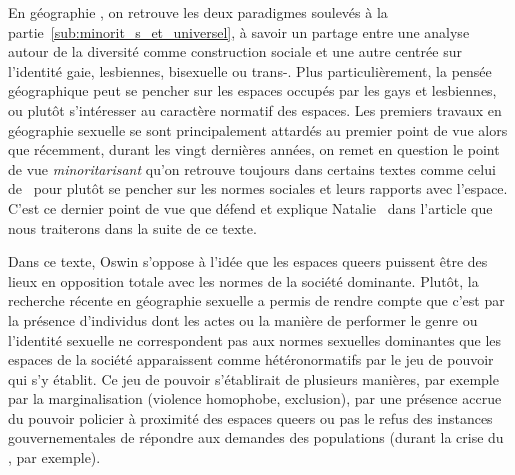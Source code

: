 
En géographie \qu{}, on retrouve les deux paradigmes soulevés à la partie~\ref{sub:minorit_s_et_universel}, à savoir un partage entre une analyse autour de la diversité comme construction sociale et une autre centrée sur l'identité gaie, lesbiennes, bisexuelle ou trans-. 
Plus particulièrement, la pensée géographique peut se pencher sur les espaces occupés par les gays et lesbiennes, ou plutôt s'intéresser au caractère normatif des espaces. 
Les premiers travaux en géographie sexuelle se sont principalement attardés au premier point de vue alors que récemment, durant les vingt dernières années, on remet en question le point de vue \emph{minoritarisant} qu'on retrouve toujours dans certains textes comme celui de~\citet{Sinfield1996} pour plutôt se pencher sur les normes sociales et leurs rapports avec l'espace. 
C'est ce dernier point de vue que défend et explique Natalie~\citet{Oswin2008} dans l'article  que nous traiterons dans la suite de ce texte.

Dans ce texte, Oswin s'oppose à l'idée que les espaces queers puissent être des lieux en opposition totale avec les normes de la société dominante. 
Plutôt, la recherche récente en géographie sexuelle a permis de rendre compte que c'est par la présence d'individus dont les actes ou la manière de performer le genre ou l'identité sexuelle ne correspondent pas aux normes sexuelles dominantes que les espaces de la société apparaissent comme hétéronormatifs par le jeu de pouvoir qui s'y établit. 
Ce jeu de pouvoir s'établirait de plusieurs manières, par exemple par la marginalisation (violence homophobe, exclusion), par une présence accrue du pouvoir policier à proximité des espaces queers ou pas le refus des instances gouvernementales de répondre aux demandes des populations \lgbt{} (durant la crise du \sida, par exemple).


